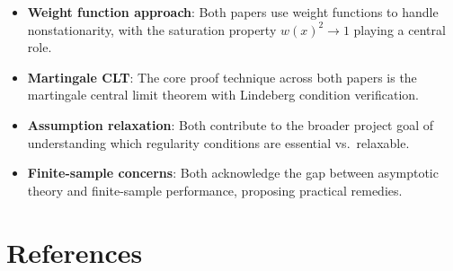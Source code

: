 \documentclass[11pt,a4paper]{article}
\theoremstyle{definition}
\theoremstyle{remark}
\begin{document}
\begin{itemize}
    \item \textbf{Weight function approach}: Both papers use weight functions to handle
    nonstationarity, with the saturation property $w(x)^2 \to 1$ playing a central role.
    \item \textbf{Martingale CLT}: The core proof technique across both papers is the
    martingale central limit theorem with Lindeberg condition verification.
    \item \textbf{Assumption relaxation}: Both contribute to the broader project goal of
    understanding which regularity conditions are essential vs.\ relaxable.
    \item \textbf{Finite-sample concerns}: Both acknowledge the gap between asymptotic
    theory and finite-sample performance, proposing practical remedies.
\end{itemize}

\section*{References}
\end{document}

